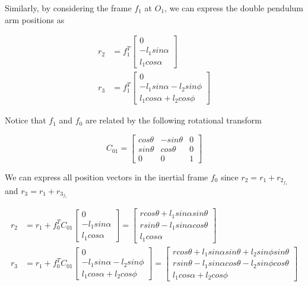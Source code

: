 \documentclass[12pt,letterpaper]{article}
\begin{document}
Similarly, by considering the frame $f_1$ at $O_1$, we can express the double pendulum arm positions as

\begin{align*}
r_2 &= f_1^T \begin{bmatrix}0\\-l_1 sin \alpha \\l_1 cos \alpha\end{bmatrix} \\
r_3 &= f_1^T \begin{bmatrix}0\\-l_1 sin \alpha -l_2 sin \phi \\l_1 cos \alpha + l_2 cos \phi \end{bmatrix}
\end{align*}

Notice that $f_1$ and $f_0$ are related by the following rotational transform

$$C_{01} = \begin{bmatrix}cos \theta&-sin \theta & 0\\sin \theta&cos \theta & 0\\0&0&1\end{bmatrix}$$

We can express all position vectors in the inertial frame $f_0$ since $r_2 = r_1 + r_2_{f_1}$ and $r_3 = r_1 + r_3_{f_1}$

\begin{align*}
r_2 &= r_1 + f_0^T C_{01} \begin{bmatrix}0\\-l_1 sin \alpha \\l_1 cos \alpha\end{bmatrix} = \begin{bmatrix}r cos \theta + l_1 sin \alpha sin \theta\\r sin \theta -l_1 sin \alpha cos \theta \\l_1 cos \alpha\end{bmatrix} \\
r_3 &= r_1 + f_0^T C_{01} \begin{bmatrix}0\\-l_1 sin \alpha -l_2 sin \phi \\l_1 cos \alpha + l_2 cos \phi \end{bmatrix} = \begin{bmatrix}r cos \theta + l_1 sin \alpha sin \theta + l_2 sin \phi sin \theta\\r sin \theta - l_1 sin \alpha cos \theta - l_2 sin \phi cos \theta \\l_1 cos \alpha + l_2 cos \phi \end{bmatrix}
\end{align*}
\end{document}
